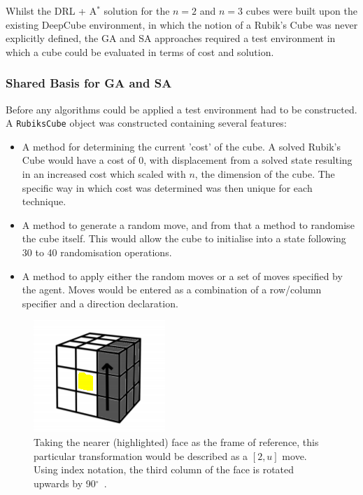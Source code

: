 \documentclass[UKenglish]{svproc}
\begin{document}
Whilst the DRL + A$^{\ast}$ solution for the $n=2$ and $n=3$ cubes were built upon the existing DeepCube environment, in which the notion of a Rubik's Cube was never explicitly defined, the GA and SA approaches required a test environment in which a cube could be evaluated in terms of cost and solution.

\subsubsection{Shared Basis for GA and SA}
Before any algorithms could be applied a test environment had to be constructed. A \verb|RubiksCube| object was constructed containing several features:
\begin{itemize}
    \item A method for determining the current 'cost' of the cube. A solved Rubik's Cube would have a cost of 0, with displacement from a solved state resulting in an increased cost which scaled with $n$, the dimension of the cube. The specific way in which cost was determined was then unique for each technique.
    \item A method to generate a random move, and from that a method to randomise the cube itself. This would allow the cube to initialise into a state following 30 to 40 randomisation operations.
    \item A method to apply either the random moves or a set of moves specified by the agent. Moves would be entered as a combination of a row/column specifier and a direction declaration.
\end{itemize}

\begin{figure}[!h]
\begin{small}
\centering
\linespread{1.0}
\includegraphics[width=0.75\linewidth]{images/move_3u}
\caption{Taking the nearer (highlighted) face as the frame of reference, this particular transformation would be described as a $[2,u]$ move. Using index notation, the third column of the face is rotated upwards by 90$^{\circ}$~\cite{proj_l.hoang}.}
\label{fig:fig2}
\end{small}
\end{figure}
\end{document}
